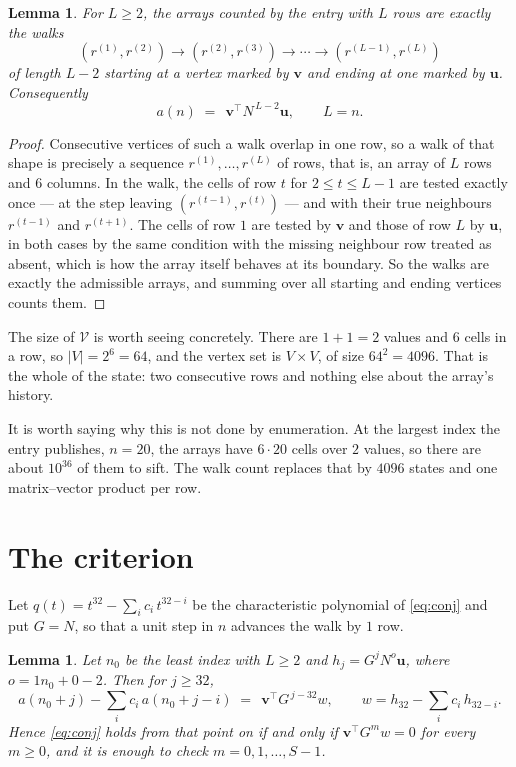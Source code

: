 \documentclass[11pt,a4paper]{article}
\theoremstyle{plain}
\newtheorem{lemma}[theorem]{Lemma}
\theoremstyle{definition}
\begin{document}
\begin{lemma}\label{lem:walk}
For $L\ge2$, the arrays counted by the entry with $L$ rows are exactly the walks
\[
(r^{(1)},r^{(2)})\to(r^{(2)},r^{(3)})\to\cdots\to(r^{(L-1)},r^{(L)})
\]
of length $L-2$ starting at a vertex marked by $\mathbf{v}$ and ending at one marked by
$\mathbf{u}$. Consequently
\[
a(n)\;=\;\,\mathbf{v}^{\!\top}N^{\,L-2}\mathbf{u},\qquad L=n .
\]
\end{lemma}

\begin{proof}
Consecutive vertices of such a walk overlap in one row, so a walk of that shape is
precisely a sequence $r^{(1)},\dots,r^{(L)}$ of rows, that is, an array of $L$ rows
and $6$ columns. In the walk, the cells of row $t$ for $2\le t\le L-1$ are tested
exactly once --- at the step leaving $(r^{(t-1)},r^{(t)})$ --- and with their true
neighbours $r^{(t-1)}$ and $r^{(t+1)}$. The cells of row $1$ are tested by
$\mathbf{v}$ and those of row $L$ by $\mathbf{u}$, in both cases by the same condition
with the missing neighbour row treated as absent, which is how the array itself behaves at
its boundary. So the walks are exactly the admissible arrays, and summing over all starting
and ending vertices counts them.
\end{proof}


The size of $\mathcal V$ is worth seeing concretely. There are $1+1=2$ values
and $6$ cells in a row, so $|V|=2^{6}=64$, and the vertex set is
$V\times V$, of size $64^2=4096$. That is the whole of the state: two consecutive
rows and nothing else about the array's history.

It is worth saying why this is not done by enumeration. At the largest index the entry
publishes, $n=20$, the arrays have $6\cdot20$ cells over
$2$ values, so there are about $10^{36}$ of them to sift. The
walk count replaces that by $4096$ states and one matrix--vector product per row.
\section{The criterion}

Let $q(t)=t^{32}-\sum_i c_i\,t^{32-i}$ be the characteristic polynomial of
\eqref{eq:conj} and put $G=N$, so that a unit step in $n$ advances the walk by
$1$ row.

\begin{lemma}\label{lem:crit}
Let $n_0$ be the least index with $L\ge2$ and $h_j=G^{j}N^{o}\mathbf{u}$, where
$o=1n_0+0-2$. Then for $j\ge32$,
\[
a(n_0+j)-\sum_i c_i\,a(n_0+j-i)\;=\;\,\mathbf{v}^{\!\top}G^{\,j-32}w,
\qquad w=h_{32}-\sum_i c_i\,h_{32-i} .
\]
Hence \eqref{eq:conj} holds from that point on if and only if
$\mathbf{v}^{\!\top}G^{m}w=0$ for every $m\ge0$, and it is enough to check
$m=0,1,\dots,S-1$.
\end{lemma}
\end{document}

